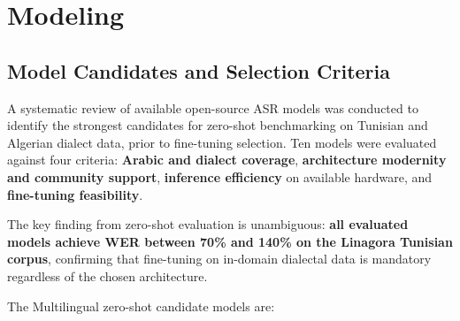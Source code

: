 \documentclass[12pt,a4paper]{report}
\begin{document}
\section{Modeling}
\subsection{Model Candidates and Selection Criteria}

A systematic review of available open-source ASR models was conducted to identify the
strongest candidates for zero-shot benchmarking on Tunisian and Algerian dialect data,
prior to fine-tuning selection. Ten models were evaluated against four criteria:
\textbf{Arabic and dialect coverage}, \textbf{architecture modernity and community support},
\textbf{inference efficiency} on available hardware, and \textbf{fine-tuning feasibility}.

\medskip
The key finding from zero-shot evaluation is unambiguous: \textbf{all evaluated models
achieve WER between 70\% and 140\% on the Linagora Tunisian corpus}, confirming that
fine-tuning on in-domain dialectal data is mandatory regardless of the chosen architecture.

\medskip
The Multilingual zero-shot candidate models are:
\end{document}
